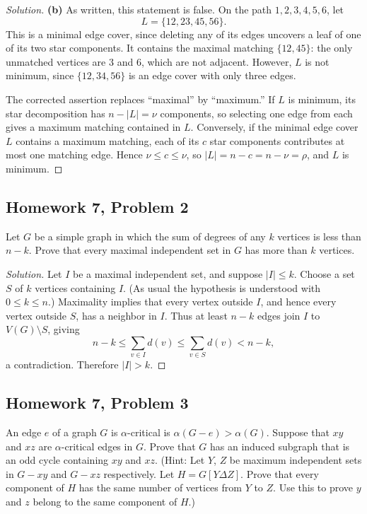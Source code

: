 \documentclass[12pt]{amsart}
\newenvironment{solution}{\begin{proof}[Solution]}{\end{proof}}
\begin{document}
\begin{solution}
        \smallskip
        \noindent\textbf{(b)} As written, this statement is false. On the path
        $1,2,3,4,5,6$, let
        \[
            L=\{12,23,45,56\}.
        \]
        This is a minimal edge cover, since deleting any of its edges uncovers
        a leaf of one of its two star components. It contains the maximal
        matching $\{12,45\}$: the only unmatched vertices are $3$ and $6$,
        which are not adjacent. However, $L$ is not minimum, since
        $\{12,34,56\}$ is an edge cover with only three edges.

        The corrected assertion replaces ``maximal'' by ``maximum.'' If $L$
        is minimum, its star decomposition has $n-|L|=\nu$ components, so
        selecting one edge from each gives a maximum matching contained in
        $L$. Conversely, if the minimal edge cover $L$ contains a maximum
        matching, each of its $c$ star components contributes at most one
        matching edge. Hence $\nu\le c\le\nu$, so
        $|L|=n-c=n-\nu=\rho$, and $L$ is minimum.
    \end{solution}

    \subsection*{Homework 7, Problem 2} Let $G$ be a simple graph in which the sum of degrees of any $k$ vertices
    is less than $n-k$.
    Prove that every maximal independent set in $G$ has more than $k$ vertices.

    \begin{solution}

        Let $I$ be a maximal independent set, and suppose $|I|\le k$.
        Choose a set $S$ of $k$ vertices containing $I$. (As usual the
        hypothesis is understood with $0\le k\le n$.) Maximality implies
        that every vertex outside $I$, and hence every vertex outside $S$,
        has a neighbor in $I$. Thus at least $n-k$ edges join $I$ to
        $V(G)\setminus S$, giving
        \[
            n-k\le\sum_{v\in I}d(v)\le\sum_{v\in S}d(v)<n-k,
        \]
        a contradiction. Therefore $|I|>k$.
    \end{solution}

    \subsection*{Homework 7, Problem 3} An edge $e$ of a graph $G$ is $\alpha$-critical is $\alpha(G - e) > \alpha(G)$.
    Suppose that $xy$ and $xz$ are $\alpha$-critical edges in $G$.
    Prove that $G$ has an induced subgraph that is an odd cycle containing $xy$ and $xz$.
    (Hint: Let $Y$, $Z$ be maximum independent sets in $G-xy$ and $G-xz$ respectively.
    Let $H = G[Y\Delta Z]$.
    Prove that every component of $H$ has the same number of vertices from $Y$ to $Z$.
    Use this to prove $y$ and $z$ belong to the same component of $H$.)
\end{document}
